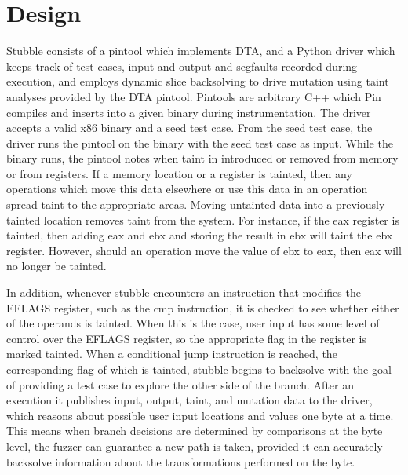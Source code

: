 \documentclass[11pt,expanded,copyright]{fsuthesis}
\begin{document}
\section{Design}


Stubble consists of a pintool which implements DTA, and a Python driver which keeps track of test cases, input and output and segfaults recorded during execution, and employs dynamic slice backsolving to drive mutation using taint analyses provided by the DTA pintool. Pintools are arbitrary C++ which Pin compiles and inserts into a given binary during instrumentation. The driver accepts a valid x86 binary and a seed test case. From the seed test case, the driver runs the pintool on the binary with the seed test case as input. While the binary runs, the pintool notes when taint in introduced or removed from memory or from registers. If a memory location or a register is tainted, then any operations which move this data elsewhere or use this data in an operation spread taint to the appropriate areas. Moving untainted data into a previously tainted location removes taint from the system. For instance, if the eax register is tainted, then adding eax and ebx and storing the result in ebx will taint the ebx register. However, should an operation move the value of ebx to eax, then eax will no longer be tainted. 

In addition, whenever stubble encounters an instruction that modifies the EFLAGS register, such as the cmp instruction, it is checked to see whether either of the operands is tainted. When this is the case, user input has some level of control over the EFLAGS register, so the appropriate flag in the register is marked tainted. When a conditional jump instruction is reached, the corresponding flag of which is tainted, stubble begins to backsolve with the goal of providing a test case to explore the other side of the branch. After an execution it publishes input, output, taint, and mutation data to the driver, which reasons about possible user input locations and values one byte at a time. This means when branch decisions are determined by comparisons at the byte level, the fuzzer can guarantee a new path is taken, provided it can accurately backsolve information about the transformations performed on the byte.
\end{document}

